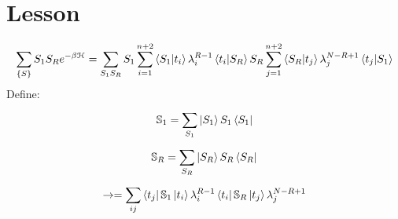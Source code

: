 \documentclass[../main/main.tex]{subfiles}
\begin{document}
\section{Lesson}


\begin{equation}
  \sum_{\{ S \}  }^{}  S_1 S_R e^{-\beta \mathcal{H}} = \sum_{S_1 S_R}^{} S_1 \sum_{i=1}^{n+2} \braket{S_1}{t_i} \lambda _i^{R-1} \braket{t_i}{S_R} S_R \sum_{j=1}^{n+2} \braket{S_R}{t_j} \lambda_j ^{N-R+1} \braket{t_j}{S_1}
\end{equation}
Define:
\begin{equation}
  \mathbb{S}_1 = \sum_{S_1}^{} \ket{S_1} S_1 \bra{S_1}
\end{equation}
\begin{equation}
\mathbb{S}_R = \sum_{S_R}^{} \ket{S_R} S_R \bra{S_R}
\end{equation}
\begin{equation}
  \rightarrow = \sum_{ij}^{} \bra{t_j } \mathbb{S}_1 \ket{t_i} \lambda _i^{R-1} \bra{t_i} \mathbb{S}_R \ket{t_j} \lambda _j ^{N-R+1}
\end{equation}
\end{document}
